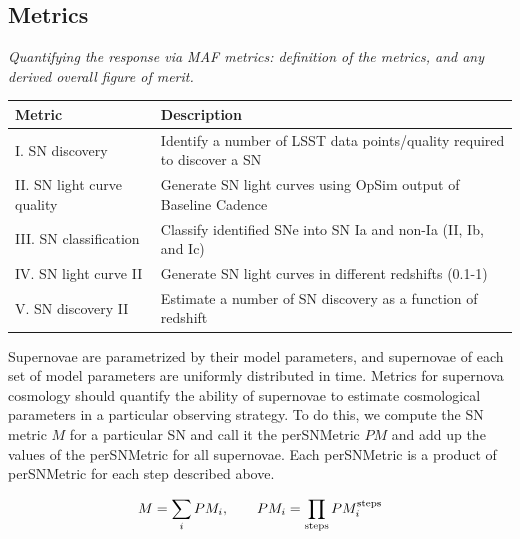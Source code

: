 






\subsection{Metrics}
\label{sec:keyword:metrics}

{\it Quantifying the response via MAF metrics: definition of the metrics,
and any derived overall figure of merit.}
\label{sec:keyword:metrics}

\begin{center}
\begin{tabular}{| p{5cm} |p{10cm}| }
\hline Metric & Description \\
\hline
I. SN discovery  &  Identify a number of LSST data points/quality required to discover a SN  \\
II. SN light curve quality & Generate SN light curves using OpSim output of Baseline Cadence \\
III. SN classification & Classify identified SNe into SN Ia and non-Ia (II, Ib, and Ic)  \\
IV. SN light curve II & Generate SN light curves in different redshifts (0.1-1) \\
V. SN discovery II &  Estimate a number of SN discovery as a function of redshift \\
\hline \end{tabular}
\end{center}


Supernovae are parametrized by their model parameters, and supernovae of each
set of model parameters are uniformly distributed in time.
Metrics for supernova cosmology should quantify the ability of supernovae 
to estimate cosmological parameters in a particular observing strategy. 
To do this, we compute the SN metric $M$ for a particular SN and call it the 
perSNMetric $PM$ and add up the values of the perSNMetric for all supernovae. 
Each perSNMetric is a product of perSNMetric for each step described above.

\begin{equation}
M = \sum_i PM_i, \qquad PM_i = \prod_{\rm{steps}} PM_i^{\rm{steps}}
\end{equation}

